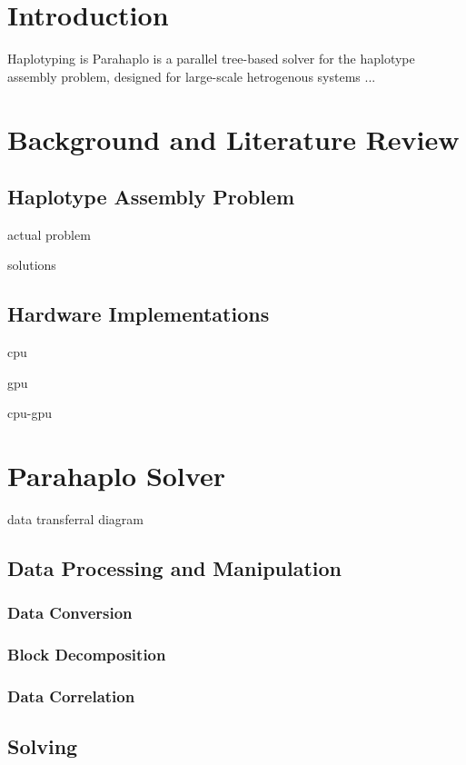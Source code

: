 \documentclass[10pt, conference, compsocconf]{IEEEtran}
\begin{document}
 
\section{Introduction} 
Haplotyping is 
Parahaplo is a parallel tree-based solver for the haplotype assembly problem, designed for large-scale
hetrogenous systems ...

 
\section{Background and Literature Review} 

\subsection{Haplotype Assembly Problem}

actual problem

solutions

\subsection{Hardware Implementations}
cpu

gpu 

cpu-gpu
\section{Parahaplo Solver}
data transferral diagram

\subsection{Data Processing and Manipulation}

\subsubsection{Data Conversion}

\subsubsection{Block Decomposition}

\subsubsection{Data Correlation}

\subsection{Solving}
\end{document}
